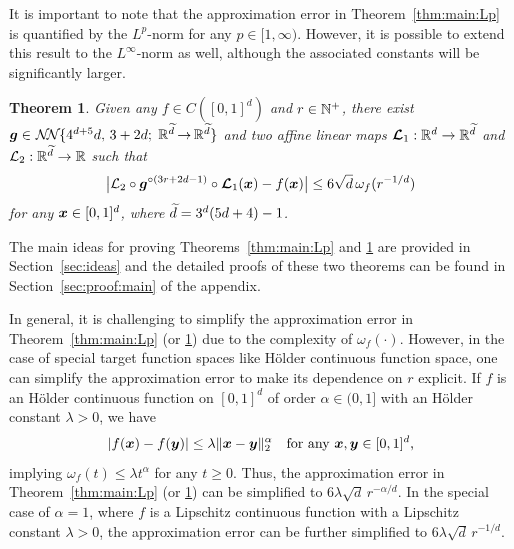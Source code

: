 \documentclass[nohyperref]{article}
\theoremstyle{plain}
\newtheorem{theorem}{Theorem}[section]
\theoremstyle{definition}
\theoremstyle{remark}
\begin{document}
It is important to note that the approximation error in Theorem~\ref{thm:main:Lp} is quantified by the $L^p$-norm for any $p\in [1,\infty)$. However, it is possible to extend this result to the $L^\infty$-norm as well, although the associated constants will be significantly larger.

\begin{theorem}
	\label{thm:main:Linfty}
	Given  any $f\in C([0,1]^d)$ and $r\in \N^+$,
	there exist $\bmg\in \nn{4^{d+5}d}{3+2d}{\tilded}{\tilded}$
	and two affine linear maps
	$\bmcalL_1:\R^d\to\R^{\tilded}$ and $\calL_2:\R^{\tilded}\to\R$
	such that 
	\begin{equation*}		\big|{\mathcal{L}}_2\circ {\bm{g}}^{\circ (3r+2d-1)}\circ {\bm{\mathcal{L}}}_1({\bm{x}})-f({\bm{x}})\big|\le 6\sqrt{d}\,\omega_f(r^{-1/d})
	\end{equation*}
	for any ${\bm{x}}\in [0,1]^d$, where ${\widetilde{d}}=3^d(5d+4)-1$.
\end{theorem}


The main ideas for proving Theorems~\ref{thm:main:Lp} and \ref{thm:main:Linfty} are provided in  Section~\ref{sec:ideas} and the detailed proofs of these two theorems can be found in Section~\ref{sec:proof:main} of the  appendix.


In general, it is challenging to simplify the approximation error in Theorem~\ref{thm:main:Lp} (or \ref{thm:main:Linfty})
due to the complexity of $\omega_f(\cdot)$. 
However, in the case of special target function spaces like H\"older continuous function space, one can simplify the approximation error to make its dependence on $r$ explicit. If  $f$ is an H{\"o}lder continuous function on $[0,1]^d$ of order $\alpha\in(0,1]$ with an H\"older constant $\lambda>0$, we have 
\begin{equation*}
	|f({\bm{x}})-f({\bm{y}})|\leq \lambda \|{\bm{x}}-{\bm{y}}\|_2^\alpha\quad \textnormal{for any ${\bm{x}},{\bm{y}}\in[0,1]^d$,}
\end{equation*}
implying $\omega_f(t)\le \lambda t^\alpha$ for any $t\ge 0$. Thus, the approximation error in Theorem~\ref{thm:main:Lp} (or \ref{thm:main:Linfty})
can be simplified to $6\lambda\sqrt{d}\,r^{-\alpha/d}$. 
In the special case of $\alpha=1$, where $f$ is a Lipschitz continuous function with a Lipschitz constant $\lambda>0$, the approximation error can be further simplified to $6\lambda\sqrt{d}\,r^{-1/d}$.
\end{document}
